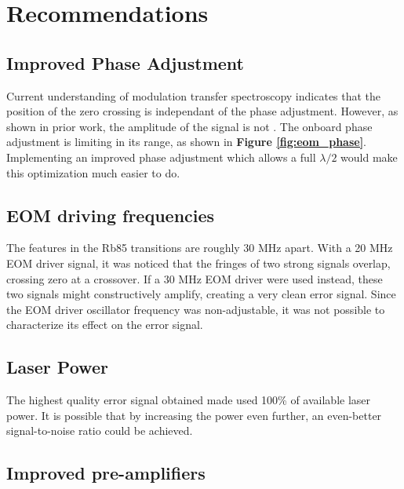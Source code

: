 \newpage

\section{Recommendations}
\label{sec:recommendations}

\subsection{Improved Phase Adjustment}

Current understanding of modulation transfer spectroscopy indicates that the position of the zero crossing is independant of the phase adjustment.  However, as shown in prior work, the amplitude of the signal is not \cite{0957-0233-19-10-105601}. The onboard phase adjustment is limiting in its range, as shown in \textbf{Figure \ref{fig:eom_phase}}.  Implementing an improved phase adjustment which allows a full $\lambda/2$ would make this optimization much easier to do.

\subsection{EOM driving frequencies}

The features in the Rb85 transitions are roughly 30 MHz apart.  With a 20 MHz EOM driver signal, it was noticed that the fringes of two strong signals overlap, crossing zero at a crossover.  If a 30 MHz EOM driver were used instead, these two signals might constructively amplify, creating a very clean error signal. Since the EOM driver oscillator frequency was non-adjustable, it was not possible to characterize its effect on the error signal.

\subsection{Laser Power}

The highest quality error signal obtained made used 100\% of available laser power.  It is possible that by increasing the power even further, an even-better signal-to-noise ratio could be achieved.

\subsection{Improved pre-amplifiers}

